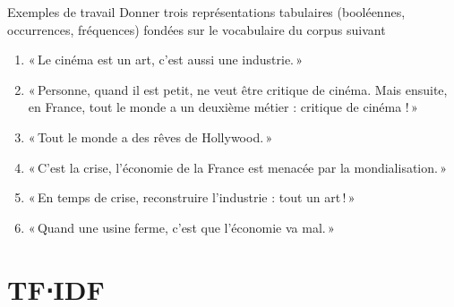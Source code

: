 \documentclass[hyperref={unicode}, xcolor={svgnames}, french]{beamer}
\title{\titlepagetitle}
\subtitle{\titlepagesubtitle}
\author{\textbf{\myname} (\mylab)}
\institute{}
\date{\tiny Version {\yyyymmdddate\today}T\currenttime}
\begin{document}

\begin{frame}[plain]
	\titlepage
\end{frame}

\begin{frame}{Exemples de travail}
	Donner trois représentations tabulaires (booléennes, occurrences, fréquences) fondées sur le vocabulaire du corpus suivant
	\begin{enumerate}
		\item « Le cinéma est un art, c’est aussi une industrie. »
		\item « Personne, quand il est petit, ne veut être critique de cinéma. Mais ensuite, en France, tout le monde a un deuxième métier : critique de cinéma ! »
		\item « Tout le monde a des rêves de Hollywood. »
		\item « C’est la crise, l’économie de la France est menacée par la mondialisation. »
		\item « En temps de crise, reconstruire l’industrie : tout un art ! »
		\item « Quand une usine ferme, c’est que l’économie va mal. »
	\end{enumerate}
\end{frame}

\section{TF⋅IDF}
\end{document}
